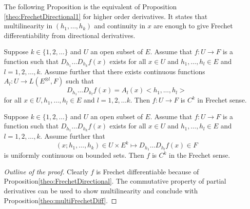 The following Proposition is the equivalent of Proposition \ref{theo:FrechetDirectional1} for higher order derivatives.
It states that multilinearity in $(h_1,\ldots,h_k)$ and continuity in $x$ are enough to give Frechet differentiability from directional derivatives.

\begin{proposition}\label{theo:multiFrechetDiff}
    Suppose $k \in \{ 1, 2, \ldots\}$ and $U$ an open subset of $E$. Assume that $f: U \rightarrow F$ is a function such that $D_{h_1} \ldots D_{h_k} f(x)$ exists for all $x \in U$ and $h_1, \ldots, h_l \in E$ and $l = 1, 2, \ldots, k$. Assume further that there exists continuous functions $A_l: U \rightarrow L(E^{\otimes l}, F)$ such that 
    \begin{equation}
        D_{h_1} \ldots D_{h_l} f(x) = A_l(x) < h_1, \ldots, h_l> 
    \end{equation}
    for all $x \in U, h_1, \ldots, h_l \in E$ and $l = 1, 2, \ldots k.$ Then $f: U \rightarrow F$ is $C^k$ in Frechet sense.
\end{proposition}

\begin{proposition}\label{theo:multiFrechetDiff2}
    Suppose $k \in \{ 1, 2, \ldots\}$ and $U$ an open subset of $E$. Assume that $f: U \rightarrow F$ is a function such that $D_{h_1} \ldots D_{h_k} f(x)$ exists for all $x \in U$ and $h_1, \ldots, h_l \in E$ and $l = 1, 2, \ldots, k$. Assume further that 
    \begin{equation}
        (x; h_1, \ldots, h_k) \in U \times E^k \mapsto D_{h_1} \ldots D_{h_l} f(x) \in F
    \end{equation}
    is uniformly continuous on bounded sets. Then $f$ is $C^k$ in the Frechet sense.
\end{proposition}
\begin{proof}[Outline of the proof]
    Clearly $f$ is Frechet differentiable because of Proposition\ref{theo:FrechetDirectional}.
    The commutative property of partial derivatives can be used to show multilinearity and conclude with Proposition\ref{theo:multiFrechetDiff}.

\end{proof}